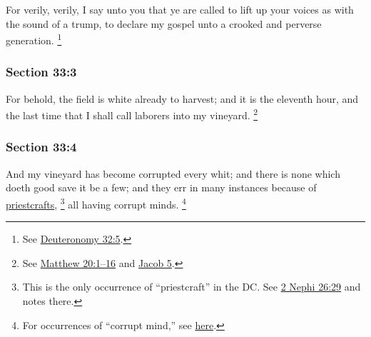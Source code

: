 		For verily, verily, I say unto you that ye are called to lift up your voices as with the sound of a trump, to declare my gospel unto a crooked and perverse generation.%
			\footnote{%
				See \hyperref[DEUTERONOMY-32-5]{Deuteronomy 32:5}.
				}


	\subsubsection{Section 33:3} %
		\label{DC33-3}

		For behold, the field is white already to harvest; and it is the eleventh hour, and the last time that I shall call laborers into my vineyard.%
			\footnote{%
				See \hyperref[MATTHEW-20-1]{Matthew 20:1--16} and \hyperref[JACOB-5]{Jacob 5}.
				}


	\subsubsection{Section 33:4} %
		\label{DC33-4}

		And my vineyard has become corrupted every whit; and there is none which doeth good save it be a few; and they err in many instances because of \hyperref[PRIESTCRAFT]{priestcrafts},%
			\footnote{%
				This is the only occurrence of ``priestcraft'' in the DC. See \hyperref[2NEPHI-26-29]{2 Nephi 26:29} and notes there.
				}
		all having corrupt minds.%
			\footnote{%
				For occurrences of ``corrupt mind,'' see \hyperref[CORRUPTION-PHRASES]{here}.
				}

